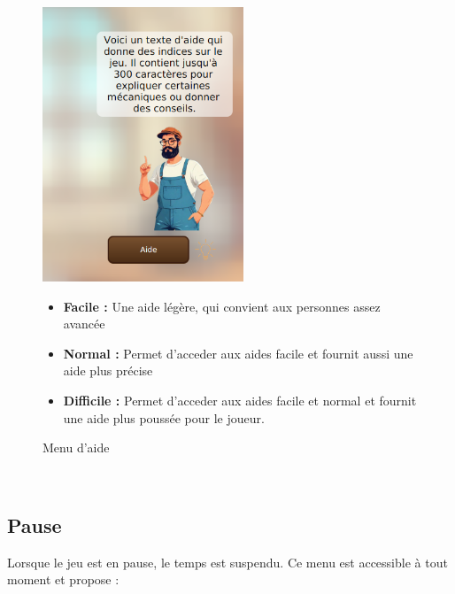 \begin{figure}[h]
    \centering
    \begin{minipage}{0.4\textwidth}
        \includegraphics[width=6cm]{../Annexe/Screen/Aide.png}
        \caption{Menu d'aide}
    \end{minipage}%
    \hfill
    \begin{minipage}{0.55\textwidth}
    \begin{itemize}
        \item \textbf{Facile :}  Une aide légère, qui convient aux personnes assez avancée
        \item \textbf{Normal :} Permet d'acceder aux aides facile et fournit aussi une aide plus précise
        \item \textbf{Difficile :} Permet d'acceder aux aides facile et normal et fournit une aide plus poussée pour le joueur.
    \end{itemize}
    \end{minipage}
\end{figure}

\\
\pagebreak
\subsection{Pause}
Lorsque le jeu est en pause, le temps est suspendu. Ce menu est accessible à tout moment et propose :

